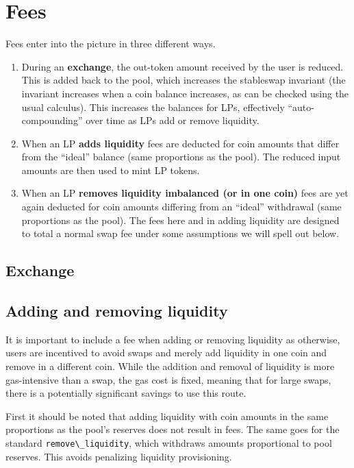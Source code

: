 \documentclass[
]{article}
\newcommand{\passthrough}[1]{#1}
\begin{document}
\hypertarget{fees}{%
\section{Fees}\label{fees}}

Fees enter into the picture in three different ways.

\begin{enumerate}
\def\labelenumi{\arabic{enumi})}
\item
  During an \textbf{exchange}, the out-token amount received by the user
  is reduced. This is added back to the pool, which increases the
  stableswap invariant (the invariant increases when a coin balance
  increases, as can be checked using the usual calculus). This increases
  the balances for LPs, effectively ``auto-compounding'' over time as
  LPs add or remove liquidity.
\item
  When an LP \textbf{adds liquidity} fees are deducted for coin amounts
  that differ from the ``ideal'' balance (same proportions as the pool).
  The reduced input amounts are then used to mint LP tokens.
\item
  When an LP \textbf{removes liquidity imbalanced (or in one coin)} fees
  are yet again deducted for coin amounts differing from an ``ideal''
  withdrawal (same proportions as the pool). The fees here and in adding
  liquidity are designed to total a normal swap fee under some
  assumptions we will spell out below.
\end{enumerate}

\hypertarget{exchange}{%
\subsection{Exchange}\label{exchange}}

\hypertarget{adding-and-removing-liquidity}{%
\subsection{Adding and removing
liquidity}\label{adding-and-removing-liquidity}}

It is important to include a fee when adding or removing liquidity as
otherwise, users are incentived to avoid swaps and merely add liquidity
in one coin and remove in a different coin. While the addition and
removal of liquidity is more gas-intensive than a swap, the gas cost is
fixed, meaning that for large swaps, there is a potentially significant
savings to use this route.

First it should be noted that adding liquidity with coin amounts in the
same proportions as the pool's reserves does not result in fees. The
same goes for the standard \passthrough{\lstinline!remove\_liquidity!},
which withdraws amounts proportional to pool reserves. This avoids
penalizing liquidity provisioning.
\end{document}
